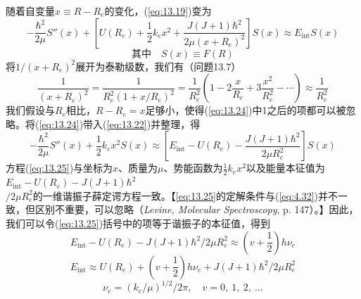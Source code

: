    随着自变量$x \equiv R - R_e$的变化，(\ref{eq:13.19})变为
    \begin{equation}
        -\frac{\hbar^2}{2\mu}S''\left(x\right) + \left[U\left(R_e\right) + \frac{1}{2}k_ex^2 + \frac{J\left(J+1\right)\hbar^2}{2\mu \left(x+R_e\right)^2} \right]S\left(x\right) \approx E_{\text{int}}S\left(x\right)
        \label{eq:13.22}
    \end{equation}
    \begin{equation}
        \text{其中} \quad S\left(x\right) \equiv F\left(R\right)
        \label{eq:13.23}
    \end{equation}
    将$1/\left(x + R_e\right)^2$展开为泰勒级数，我们有（问题13.7）
    \begin{equation}
        \frac{1}{\left(x + R_e\right)^2} = \frac{1}{R_e^2\left(1 + x/R_e\right)^2} = \frac{1}{R_e^2} \left(1 - 2\frac{x}{R_e} + 3\frac{x^2}{R_e^2} - \cdots\right) \approx \frac{1}{R_e^2}
        \label{eq:13.24}
    \end{equation}
    我们假设与$R_e$相比，$R-R_e=x$足够小，使得(\ref{eq:13.24})中1之后的项都可以被忽略。将(\ref{eq:13.24})带入(\ref{eq:13.22})并整理，得
    \begin{equation}
        -\frac{\hbar^2}{2\mu}S''\left(x\right) + \frac{1}{2}k_ex^2S\left(x\right) \approx \left[E_{\text{int}} - U\left(R_e\right) - \frac{J\left(J+1\right)\hbar^2}{2\mu R_e^2}\right]S\left(x\right)
        \label{eq:13.25}
    \end{equation}
    方程(\ref{eq:13.25})与坐标为$x$、质量为$\mu$、势能函数为$\frac{1}{2}k_ex^2$以及能量本征值为$E_{\text{int}} - U\left(R_e\right) - J\left(J+1\right)\hbar^2$\\$/2\mu R_e^2$的一维谐振子薛定谔方程一致。【\ref{eq:13.25}的定解条件与(\ref{eq:4.32})并不一致，但区别不重要，可以忽略（\textit{Levine, Molecular Spectroscopy}, p. 147）。】因此，我们可以令(\ref{eq:13.25})括号中的项等于谐振子的本征值，得到
    \begin{equation*}
        E_{\text{int}} - U\left(R_e\right) - {J\left(J+1\right)\hbar^2}/{2\mu R_e^2} \approx \left(v + \frac{1}{2}\right)h\nu_e
    \end{equation*}
    \begin{equation}
        E_{\text{int}} \approx U\left(R_e\right) + \left(v + \frac{1}{2}\right)h\nu_e + J\left(J+1\right)\hbar^2/2\mu R_e^2
        \label{eq:13.26}
    \end{equation}
    \begin{equation}
        \nu_e = \left(k_e/\mu\right)^{1/2} /2\pi ,\quad v = 0,\:1,\:2,\:\ldots
        \label{eq:13.27}
    \end{equation}
